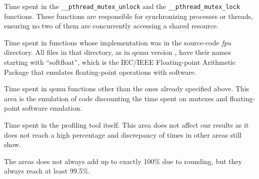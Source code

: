 \documentclass[11pt,twoside]{article}
\begin{document}
  {\bf \mutexname} \space\space
  Time spent in the {\tt \_\_pthread\_mutex\_unlock} and
  the {\tt \_\_pthread\_mutex\_lock} functions.
  These functions are responsible for
  synchronizing processes or threads, ensuring no two of them
  are concurrently accessing a shared resource.
  
  {\bf \fpname} \space\space
  Time spent in functions whose implementation was in the
  source-code {\it fpu} directory.
  All files in that directory, as in qemu version \qemuversion,
  have their names starting with
  ``softfloat'', which is the IEC/IEEE Floating-point Arithmetic
  Package that emulates floating-point operations with software.
  
  {\bf \qname} \space\space
  Time spent in qemu functions other than the ones already
  specified above. This area is the
  emulation of code discounting the time spent on mutexes and
  floating-point software emulation.
  
  {\bf \perfname} \space\space
  Time spent in the profiling tool itself.
  This area does not affect our results as
  it does not reach a high percentage and
  discrepancy of times in other areas still show.

  The areas does not always add up to exactly 100\% due to
  rounding, but they always reach at least 99.5\%.
    
\end{document}

